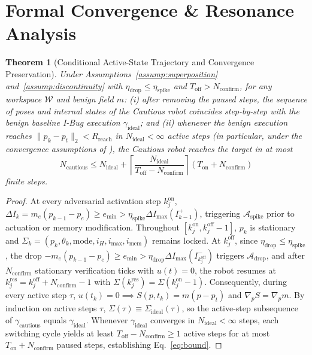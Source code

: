 \documentclass[10pt, a4paper, twocolumn]{article}
\newtheorem{theorem}{Theorem}
\begin{document}
\section{Formal Convergence \& Resonance Analysis}

\begin{theorem}[Conditional Active-State Trajectory and Convergence Preservation]
\label{thm:cautious}
Under Assumptions~\ref{assump:superposition} and~\ref{assump:discontinuity} with $\eta_{\text{drop}} \le \eta_{\text{spike}}$ and $T_{\text{off}} > N_{\text{confirm}}$, for any workspace $\mathcal{W}$ and benign field $m$:
(i) after removing the paused steps, the sequence of poses and internal states of the Cautious robot coincides step-by-step with the benign baseline I-Bug execution $\gamma_{\text{ideal}}$; and
(ii) whenever the benign execution reaches $\|p_k - p_t\|_2 < R_{\text{reach}}$ in $N_{\text{ideal}} < \infty$ active steps (in particular, under the convergence assumptions of \cite{taylor2014intensity}), the Cautious robot reaches the target in at most
\begin{equation}
    N_{\text{cautious}} \le N_{\text{ideal}} + \left\lceil \frac{N_{\text{ideal}}}{T_{\text{off}} - N_{\text{confirm}}} \right\rceil (T_{\text{on}} + N_{\text{confirm}})
    \label{eq:bound}
\end{equation}
finite steps.
\end{theorem}

\begin{proof}
At every adversarial activation step $k_j^{\text{on}}$, $\Delta I_k = m_e(p_{k-1} - p_e) \ge e_{\min} > \eta_{\text{spike}}\Delta I_{\max}(I_{k-1}^+)$, triggering $\mathcal{A}_{\text{spike}}$ prior to actuation or memory modification. Throughout $[k_j^{\text{on}}, k_j^{\text{off}}-1]$, $p_k$ is stationary and $\Sigma_k = (p_k, \theta_k, \text{mode}, i_H, i_{\text{max}}, i_{\text{mem}})$ remains locked. At $k_j^{\text{off}}$, since $\eta_{\text{drop}} \le \eta_{\text{spike}}$, the drop $-m_e(p_{k-1}-p_e) \ge e_{\min} > \eta_{\text{drop}}\Delta I_{\max}(I_{k_j^{\text{off}}}^-)$ triggers $\mathcal{A}_{\text{drop}}$, and after $N_{\text{confirm}}$ stationary verification ticks with $u(t)=0$, the robot resumes at $k_j^{\text{res}} = k_j^{\text{off}} + N_{\text{confirm}} - 1$ with $\Sigma(k_j^{\text{res}}) = \Sigma(k_j^{\text{on}} - 1)$. Consequently, during every active step $\tau$, $u(t_k) = 0 \implies S(p, t_k) = m(p - p_t)$ and $\nabla_p S = \nabla_p m$. By induction on active steps $\tau$, $\Sigma(\tau) \equiv \Sigma_{\text{ideal}}(\tau)$, so the active-step subsequence of $\gamma_{\text{cautious}}$ equals $\gamma_{\text{ideal}}$. Whenever $\gamma_{\text{ideal}}$ converges in $N_{\text{ideal}} < \infty$ steps, each switching cycle yields at least $T_{\text{off}} - N_{\text{confirm}} \ge 1$ active steps for at most $T_{\text{on}} + N_{\text{confirm}}$ paused steps, establishing Eq.~\eqref{eq:bound}.
\end{proof}
\end{document}
